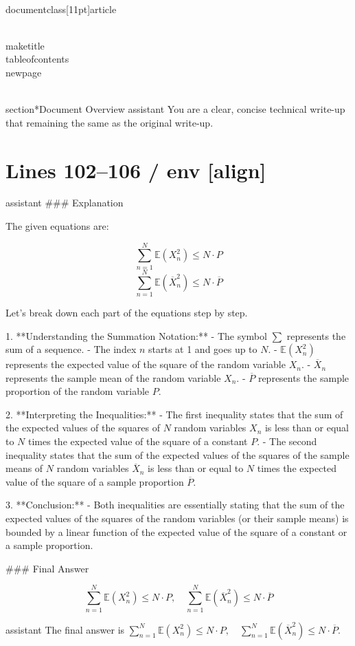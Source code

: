 \\documentclass[11pt]{article}
\begin{document}
\\maketitle
\\tableofcontents
\\newpage

\\section*{Document Overview}
assistant
You are a clear, concise technical write-up that remaining the same as the original write-up.

\newpage

\section*{Lines 102–106 / env [align]}
assistant
### Explanation

The given equations are:

\[
\sum_{n=1}^N\mathbb{E}(X_n^2) \leq N\cdot P 
\]
\[
\sum_{n=1}^N\mathbb{E}(\overline{X}_n^2) \leq N\cdot \overline{P}
\]

Let's break down each part of the equations step by step.

1. **Understanding the Summation Notation:**
   - The symbol \(\sum\) represents the sum of a sequence.
   - The index \(n\) starts at 1 and goes up to \(N\).
   - \(\mathbb{E}(X_n^2)\) represents the expected value of the square of the random variable \(X_n\).
   - \(\overline{X}_n\) represents the sample mean of the random variable \(X_n\).
   - \(\overline{P}\) represents the sample proportion of the random variable \(P\).

2. **Interpreting the Inequalities:**
   - The first inequality states that the sum of the expected values of the squares of \(N\) random variables \(X_n\) is less than or equal to \(N\) times the expected value of the square of a constant \(P\).
   - The second inequality states that the sum of the expected values of the squares of the sample means of \(N\) random variables \(\overline{X}_n\) is less than or equal to \(N\) times the expected value of the square of a sample proportion \(\overline{P}\).

3. **Conclusion:**
   - Both inequalities are essentially stating that the sum of the expected values of the squares of the random variables (or their sample means) is bounded by a linear function of the expected value of the square of a constant or a sample proportion.

### Final Answer

\[
\boxed{\sum_{n=1}^N\mathbb{E}(X_n^2) \leq N\cdot P, \quad \sum_{n=1}^N\mathbb{E}(\overline{X}_n^2) \leq N\cdot \overline{P}}
\]

assistant
The final answer is \(\boxed{\sum_{n=1}^N\mathbb{E}(X_n^2) \leq N\cdot P, \quad \sum_{n=1}^N\mathbb{E}(\overline{X}_n^2) \leq N\cdot \overline{P}}\).
\end{document}
